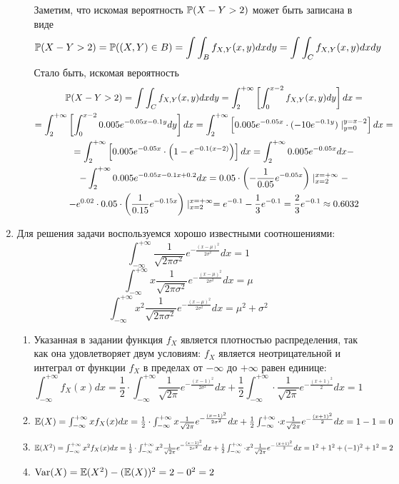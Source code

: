 \documentclass[12pt, a4paper]{article}\usepackage[]{graphicx}\usepackage[]{color}
\begin{document}
\begin{enumerate}
\begin{enumerate}
	Заметим, что искомая вероятность  $\P(X-Y > 2)$ может быть записана в виде
	\[
	\P(X-Y > 2) = \P((X, Y) \in B ) = \int \int_B f_{X, Y} (x, y) dx dy = \int \int_C f_{X, Y} (x, y) dx dy
	\]
	Стало быть, искомая вероятность
	\begin{multline*}
	\P(X-Y > 2) = \int \int_C f_{X, Y} (x, y) dx dy = \int_{2}^{+\infty} \left[ \int_{0}^{x-2} f_{X, Y} (x, y) dy \right] dx =\\
	= \int_{2}^{+\infty} \left[ \int_{0}^{x-2} 0.005e^{-0.05x-0.1y}dy \right] dx 
	= \int_{2}^{+\infty} \left[ 0.005e^{-0.05x} \cdot (-10e^{-0.1y}) \mid_{y=0}^{y=x-2} \right] dx = \\
	=  \int_{2}^{+\infty} \left[ 0.005e^{-0.05x} \cdot\left(1-e^{-0.1(x-2)}  \right) \right] dx  = \int_{2}^{+\infty} 0.005e^{-0.05x} dx - \\
	- \int_{2}^{+\infty} 0.005e^{-0.05x-0.1x+0.2} dx 
	= 0.05 \cdot \left( -\frac{1}{0.05}e^{-0.05x}  \right) \mid_{x=2}^{x=+\infty} - \\
	- e^{0.02} \cdot 0.05 \cdot \left( \frac{1}{0.15} e^{-0.15x} \right)\mid_{x=2}^{x=+\infty}
	= e^{-0.1} -\frac{1}{3} e^{-0.1} = \frac{2}{3}e^{-0.1}  \approx 0.6032
	\end{multline*}
\end{enumerate}
\item Для решения задачи воспользуемся хорошо известными соотношениями:
\[
\int_{-\infty}^{+\infty} \frac{1}{\sqrt{2\pi\sigma^2}} e^{-\frac{(x-\mu)^2}{2\sigma^2}} dx = 1
\]
\[
\int_{-\infty}^{+\infty} x\frac{1}{\sqrt{2\pi\sigma^2}} e^{-\frac{(x-\mu)^2}{2\sigma^2}} dx = \mu
\]
\[
\int_{-\infty}^{+\infty} x^2 \frac{1}{\sqrt{2\pi\sigma^2}} e^{-\frac{(x-\mu)^2}{2\sigma^2}} dx = \mu^2 + \sigma^2
\]
\begin{enumerate}
	\item Указанная в задании функция $f_X$ является плотностью распределения, так как она удовлетворяет двум условиям:  $f_X$ является неотрицательной и интеграл от функции $f_X$ в пределах от  $-\infty$ до $+\infty$ равен единице:
	\[
	\int_{-\infty}^{+\infty} f_X (x) dx = \frac{1}{2} \cdot \int_{-\infty}^{+\infty}  \frac{1}{\sqrt{2\pi}} e^{-\frac{(x-1)^2}{2\sigma^2}} dx  + \frac{1}{2} \int_{-\infty}^{+\infty} \cdot \frac{1}{\sqrt{2\pi}} e^{-\frac{(x+1)^2}{2}} dx = 1
	\]
	\item $\E(X) =\int_{-\infty}^{+\infty} xf_X (x) dx =  \frac{1}{2} \cdot \int_{-\infty}^{+\infty} x \frac{1}{\sqrt{2\pi}} e^{-\frac{(x-1)^2}{2\sigma^2}} dx  + \frac{1}{2}\int_{-\infty}^{+\infty} \cdot x \frac{1}{\sqrt{2\pi}} e^{-\frac{(x+1)^2}{2}} dx = 1- 1=  0$
	\item $\E(X^2) = \int_{-\infty}^{+\infty} x^2 f_X (x) dx  =  \frac{1}{2} \cdot \int_{-\infty}^{+\infty} x^2 \frac{1}{\sqrt{2\pi}} e^{-\frac{(x-1)^2}{2\sigma^2}} dx  + \frac{1}{2} \int_{-\infty}^{+\infty}\cdot x^2 \frac{1}{\sqrt{2\pi}} e^{-\frac{(x+1)^2}{2}} dx = 1^2 + 1^2 + (-1)^2 + 1^2 =  2$
	\item $\Var(X) = \E(X^2) - (\E(X))^2 = 2 - 0^2 = 2$
\end{enumerate}
\end{enumerate}
\end{document}
